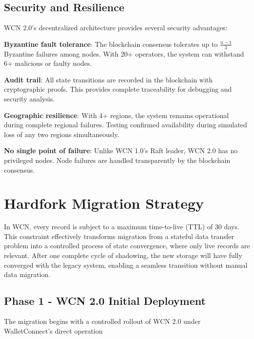 \documentclass[10pt,twocolumn]{article}
\begin{document}
\subsection{Security and Resilience}

WCN 2.0's decentralized architecture provides several security advantages:

\textbf{Byzantine fault tolerance}: The blockchain consensus tolerates up to $\frac{n-1}{3}$ Byzantine failures among nodes. With 20+ operators, the system can withstand 6+ malicious or faulty nodes.

\textbf{Audit trail}: All state transitions are recorded in the blockchain with cryptographic proofs. This provides complete traceability for debugging and security analysis.

\textbf{Geographic resilience}: With 4+ regions, the system remains operational during complete regional failures. Testing confirmed availability during simulated loss of any two regions simultaneously.

\textbf{No single point of failure}: Unlike WCN 1.0's Raft leader, WCN 2.0 has no privileged nodes. Node failures are handled transparently by the blockchain consensus.

\section{Hardfork Migration Strategy}

In WCN, every record is subject to a maximum time-to-live (TTL) of 30 days. This constraint effectively transforms migration from a stateful data transfer problem into a controlled process of state convergence, where only live records are relevant. After one complete cycle of shadowing, the new storage will have fully converged with the legacy system, enabling a seamless transition without manual data migration.

\subsection*{Phase 1 - WCN 2.0 Initial Deployment}

The migration begins with a controlled rollout of WCN 2.0 under WalletConnect’s direct operation
\end{document}
